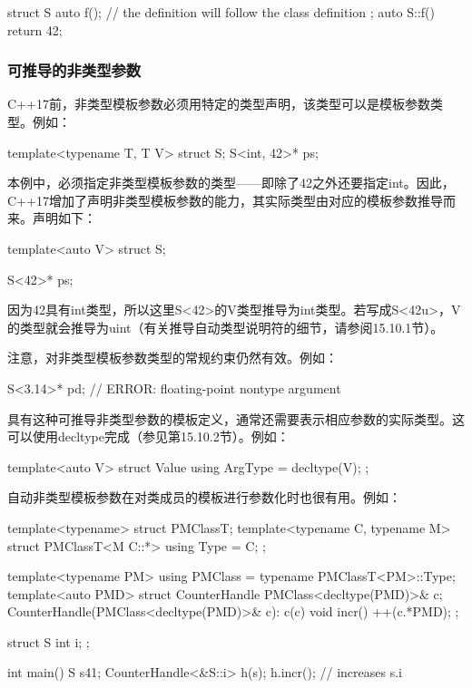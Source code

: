 \begin{cpp}
struct S {
	auto f(); // the definition will follow the class definition
};
auto S::f() { return 42; }
\end{cpp}

\subsubsection{可推导的非类型参数}

C++17前，非类型模板参数必须用特定的类型声明，该类型可以是模板参数类型。例如：

\begin{cpp}
template<typename T, T V> struct S;
S<int, 42>* ps;
\end{cpp}

本例中，必须指定非类型模板参数的类型——即除了42之外还要指定int。因此，C++17增加了声明非类型模板参数的能力，其实际类型由对应的模板参数推导而来。声明如下：

\begin{cpp}
template<auto V> struct S;
\end{cpp}


\begin{cpp}
S<42>* ps;
\end{cpp}

因为42具有int类型，所以这里S<42>的V类型推导为int类型。若写成S<42u>，V的类型就会推导为uint（有关推导自动类型说明符的细节，请参阅15.10.1节）。

注意，对非类型模板参数类型的常规约束仍然有效。例如：

\begin{cpp}
S<3.14>* pd; // ERROR: floating-point nontype argument
\end{cpp}

具有这种可推导非类型参数的模板定义，通常还需要表示相应参数的实际类型。这可以使用decltype完成（参见第15.10.2节）。例如：

\begin{cpp}
template<auto V> struct Value {
	using ArgType = decltype(V);
};
\end{cpp}

自动非类型模板参数在对类成员的模板进行参数化时也很有用。例如：

\begin{cpp}
template<typename> struct PMClassT;
template<typename C, typename M> struct PMClassT<M C::*> {
	using Type = C;
};

template<typename PM> using PMClass = typename PMClassT<PM>::Type;
template<auto PMD> struct CounterHandle {
	PMClass<decltype(PMD)>& c;
	CounterHandle(PMClass<decltype(PMD)>& c): c(c) {
	}
	void incr() {
		++(c.*PMD);
	}
};

struct S {
	int i;
};

int main() {
	S s{41};
	CounterHandle<&S::i> h(s);
	h.incr(); // increases s.i
}
\end{cpp}

